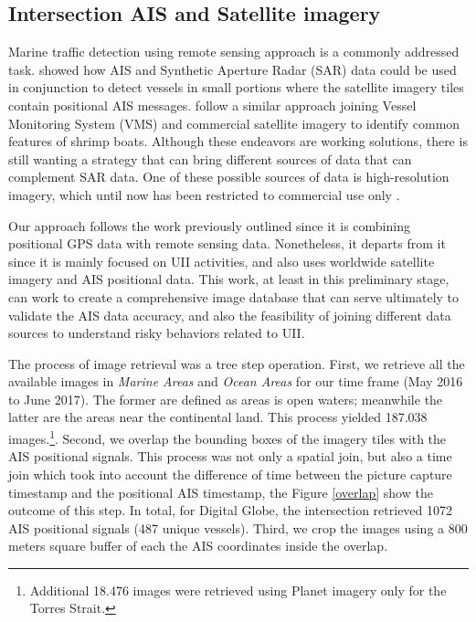 \subsection{Intersection AIS and Satellite imagery}

Marine traffic detection using remote sensing approach is a commonly addressed task.  showed how 
AIS and Synthetic Aperture Radar (SAR) data could be used in conjunction to detect vessels in small portions where
the satellite imagery tiles contain positional AIS messages.  follow a similar approach joining
Vessel Monitoring System (VMS) and commercial satellite imagery to identify common features of shrimp boats. Although
these endeavors are working solutions, there is still wanting a strategy that can bring different sources of data that
can complement SAR data. One of these possible sources of data is high-resolution imagery, which until now has been 
restricted to commercial use only \cite{Greidanus2006}.

Our approach follows the work previously outlined since it is combining positional GPS data with remote sensing data. 
Nonetheless, it departs from it since it is mainly focused on UII activities, and also uses worldwide satellite imagery 
and AIS positional data. This work, at least in this preliminary stage, can work to create a comprehensive image 
database that can serve ultimately to validate the AIS data accuracy, and also the feasibility of joining different 
data sources to understand risky behaviors related to UII. 

The process of image retrieval was a tree step operation. First, we retrieve all the available images in \textit{Marine Areas} and
\textit{Ocean Areas} for our time frame (May 2016 to June 2017). The former are defined as areas is open waters; meanwhile the latter
are the areas near the continental land. This process yielded 187.038 images.\footnote{Additional 18.476 images were retrieved using 
Planet imagery only for the Torres Strait.}. Second, we overlap the bounding boxes of the imagery tiles with the AIS positional signals. 
This process was not only a spatial join, but also a time join which took into account the difference of time between the picture 
capture timestamp and the positional AIS timestamp, the Figure \ref{overlap} show the outcome of this step. In total, for Digital Globe,
the intersection retrieved 1072 AIS positional signals (487 unique vessels). Third, we crop the images using a 800 meters square buffer 
of each the AIS coordinates inside the overlap. 


